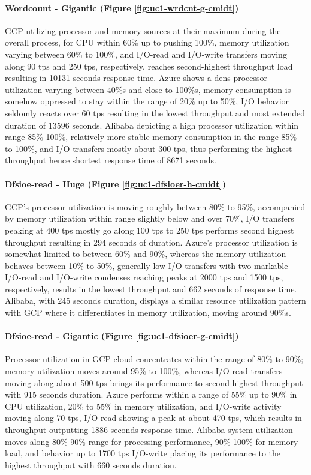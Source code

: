 \documentclass[review]{elsarticle}
\begin{document}
\paragraph{Wordcount - Gigantic (Figure \ref{fig:uc1-wrdcnt-g-cmidt})}GCP utilizing processor and memory sources at their maximum during the overall process, for CPU within 60\% up to pushing 100\%, memory utilization varying between 60\% to 100\%, and I/O-read and I/O-write transfers moving along 90 tps and 250 tps, respectively, reaches second-highest throughput load resulting in 10131 seconds response time. Azure shows a dens processor utilization varying between 40\%s and close to 100\%s, memory consumption is somehow oppressed to stay within the range of 20\% up to 50\%, I/O behavior seldomly reacts over 60 tps resulting in the lowest throughput and most extended duration of 13596 seconds. Alibaba depicting a high processor utilization within range 85\%-100\%, relatively more stable memory consumption in the range 85\% to 100\%, and I/O transfers mostly about 300 tps, thus performing the highest throughput hence shortest response time of 8671 seconds.

\paragraph{Dfsioe-read - Huge (Figure \ref{fig:uc1-dfsioer-h-cmidt})}GCP's processor utilization is moving roughly between 80\% to 95\%, accompanied by memory utilization within range slightly below and over 70\%, I/O transfers peaking at 400 tps mostly go along 100 tps to 250 tps performs second highest throughput resulting in 294 seconds of duration. Azure's processor utilization is somewhat limited to between 60\% and 90\%, whereas the memory utilization behaves between 10\% to 50\%, generally low I/O transfers with two markable I/O-read and I/O-write condenses reaching peaks at 2000 tps and 1500 tps, respectively, results in the lowest throughput and 662 seconds of response time. Alibaba, with 245 seconds duration, displays a similar resource utilization pattern with GCP where it differentiates in memory utilization, moving around 90\%s.

\paragraph{Dfsioe-read - Gigantic (Figure \ref{fig:uc1-dfsioer-g-cmidt})}Processor utilization in GCP cloud concentrates within the range of 80\% to 90\%; memory utilization moves around 95\% to 100\%, whereas I/O read transfers moving along about 500 tps brings its performance to second highest throughput with 915 seconds duration. Azure performs within a range of 55\% up to 90\% in CPU utilization, 20\% to 55\% in memory utilization, and I/O-write activity moving along 70 tps, I/O-read showing a peak at about 470 tps, which results in throughput outputting 1886 seconds response time. Alibaba system utilization moves along 80\%-90\% range for processing performance, 90\%-100\% for memory load, and behavior up to 1700 tps I/O-write placing its performance to the highest throughput with 660 seconds duration.
\end{document}
